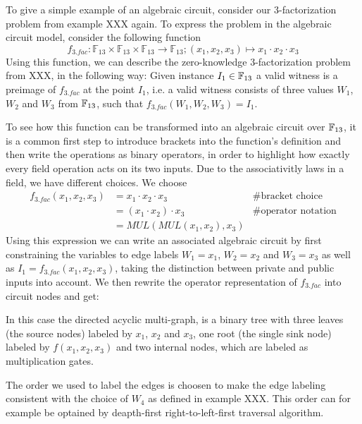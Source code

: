\begin{example} To give a simple example of an algebraic circuit, consider our $3$-factorization problem from example XXX again.  To express the problem in the algebraic circuit model, consider the following function 
\[
f_{3.fac}:\mathbb{F}_{13}\times\mathbb{F}_{13}\times\mathbb{F}_{13}\to\mathbb{F}_{13};(x_{1},x_{2},x_{3})\mapsto x_{1}\cdot x_{2}\cdot x_{3}
\]
Using this function, we can describe the zero-knowledge $3$-factorization problem from XXX, in the following way: Given instance $I_1\in \mathbb{F}_{13}$ a valid witness is a preimage of $f_{3.fac}$ at the point $I_1$, i.e. a valid witness consists of three values $W_1$, $W_2$ and $W_3$ from $\mathbb{F}_{13}$, such that $f_{3.fac}(W_1,W_2,W_3)=I_1$. 

To see how this function can be transformed into an algebraic circuit over $\mathbb{F}_{13}$, it is a common first step to introduce brackets into the function's definition and then write the operations as binary operators, in order to highlight how exactly every field operation acts on its two inputs. Due to the associativitly laws in a field, we have different choices. We choose
\begin{align*}
f_{3.fac}(x_1,x_2,x_3) & = x_1\cdot x_2 \cdot x_3  & \text{\# bracket choice} \\
                       & = (x_1\cdot x_2 ) \cdot x_3  & \text{\# operator notation} \\
                       & = MUL(MUL(x_1,x_2),x_3)
\end{align*}
Using this expression we can write an associated algebraic circuit by first constraining the variables to edge labels $W_1=x_1$, $W_2=x_2$ and $W_3=x_3$ as well as $I_1=f_{3.fac}(x_1,x_2,x_3)$, taking the distinction between private and public inputs into account. We then rewrite the operator representation of $f_{3.fac}$ into circuit nodes and get: 
\begin{center}
\end{center}
In this case the directed acyclic multi-graph, is a binary tree with three leaves (the source nodes) labeled by $x_1$, $x_2$ and $x_3$, one root (the single sink node) labeled by $f(x_1,x_2,x_3)$ and two internal nodes, which are labeled as multiplication gates. 

The order we used to label the edges is choosen to make the edge labeling consistent with the choice of $W_4$ as defined in example XXX. This order can for example be optained by deapth-first right-to-left-first traversal algorithm.
\end{example}
